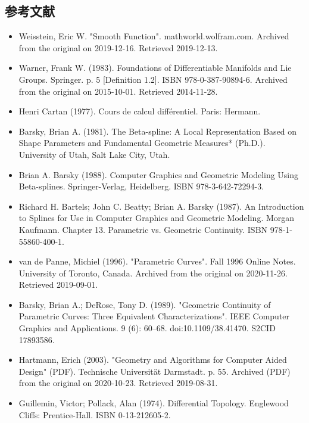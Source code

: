\subsection{参考文献}
\begin{itemize}
\item Weisstein, Eric W. "Smooth Function". mathworld.wolfram.com. Archived from the original on 2019-12-16. Retrieved 2019-12-13.
\item Warner, Frank W. (1983). Foundations of Differentiable Manifolds and Lie Groups. Springer. p. 5 [Definition 1.2]. ISBN 978-0-387-90894-6. Archived from the original on 2015-10-01. Retrieved 2014-11-28.
\item Henri Cartan (1977). Cours de calcul différentiel. Paris: Hermann.
\item Barsky, Brian A. (1981). The Beta-spline: A Local Representation Based on Shape Parameters and Fundamental Geometric Measures* (Ph.D.). University of Utah, Salt Lake City, Utah.
\item Brian A. Barsky (1988). Computer Graphics and Geometric Modeling Using Beta-splines. Springer-Verlag, Heidelberg. ISBN 978-3-642-72294-3.
\item Richard H. Bartels; John C. Beatty; Brian A. Barsky (1987). An Introduction to Splines for Use in Computer Graphics and Geometric Modeling. Morgan Kaufmann. Chapter 13. Parametric vs. Geometric Continuity. ISBN 978-1-55860-400-1.
\item van de Panne, Michiel (1996). "Parametric Curves". Fall 1996 Online Notes. University of Toronto, Canada. Archived from the original on 2020-11-26. Retrieved 2019-09-01.
\item Barsky, Brian A.; DeRose, Tony D. (1989). "Geometric Continuity of Parametric Curves: Three Equivalent Characterizations". IEEE Computer Graphics and Applications. 9 (6): 60–68. doi:10.1109/38.41470. S2CID 17893586.
\item Hartmann, Erich (2003). "Geometry and Algorithms for Computer Aided Design" (PDF). Technische Universität Darmstadt. p. 55. Archived (PDF) from the original on 2020-10-23. Retrieved 2019-08-31.
\item Guillemin, Victor; Pollack, Alan (1974). Differential Topology. Englewood Cliffs: Prentice-Hall. ISBN 0-13-212605-2.
\end{itemize}